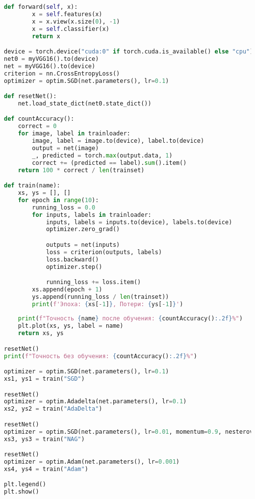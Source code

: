 \documentclass[a4paper, 14pt]{extarticle}
\begin{document}
\begin{lstlisting}[language=Python,caption={VGG16.py},label={lst:code2}]
    def forward(self, x):
        x = self.features(x)
        x = x.view(x.size(0), -1)
        x = self.classifier(x)
        return x

device = torch.device("cuda:0" if torch.cuda.is_available() else "cpu")
net0 = myVGG16().to(device)
net = myVGG16().to(device)
criterion = nn.CrossEntropyLoss()
optimizer = optim.SGD(net.parameters(), lr=0.1)

def resetNet():
    net.load_state_dict(net0.state_dict())

def countAccuracy():
    correct = 0
    for image, label in trainloader:
        image, label = image.to(device), label.to(device)
        output = net(image)
        _, predicted = torch.max(output.data, 1)
        correct += (predicted == label).sum().item()
    return 100 * correct / len(trainset)

def train(name):
    xs, ys = [], []
    for epoch in range(10):
        running_loss = 0.0
        for inputs, labels in trainloader:
            inputs, labels = inputs.to(device), labels.to(device)
            optimizer.zero_grad()

            outputs = net(inputs)
            loss = criterion(outputs, labels)
            loss.backward()
            optimizer.step()

            running_loss += loss.item()
        xs.append(epoch + 1)
        ys.append(running_loss / len(trainset))
        print(f'Эпоха: {xs[-1]}, Потери: {ys[-1]}')
    
    print(f"Точность {name} после обучения: {countAccuracy():.2f}%")
    plt.plot(xs, ys, label = name)
    return xs, ys

resetNet()
print(f"Точность без обучения: {countAccuracy():.2f}%")

optimizer = optim.SGD(net.parameters(), lr=0.1)
xs1, ys1 = train("SGD")

resetNet()
optimizer = optim.Adadelta(net.parameters(), lr=0.1)
xs2, ys2 = train("AdaDelta")

resetNet()
optimizer = optim.SGD(net.parameters(), lr=0.01, momentum=0.9, nesterov=True)
xs3, ys3 = train("NAG")

resetNet()
optimizer = optim.Adam(net.parameters(), lr=0.001)
xs4, ys4 = train("Adam")

plt.legend()
plt.show()
\end{lstlisting}
\end{document}
